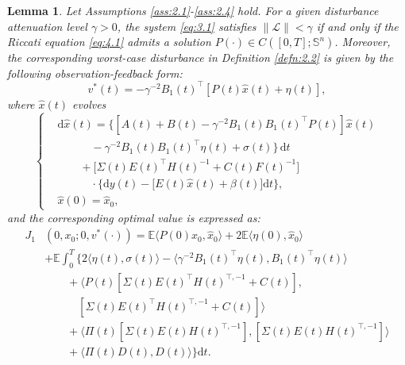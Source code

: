 \documentclass[lettersize,journal]{IEEEtran}
\theoremstyle{plain}
\newtheorem{lem}[thm]{Lemma}
\theoremstyle{definition}
\begin{document}
\begin{lem}\label{lem:4.3}
	Let Assumptions \ref{ass:2.1}-\ref{ass:2.4} hold. For a given disturbance attenuation level $\gamma > 0$, the system \eqref{eq:3.1} satisfies $\|\mathcal{L}\| < \gamma$ if and only if the Riccati equation \eqref{eq:4.1} admits a solution $P(\cdot) \in C([0,T];\mathbb{S}^n)$. Moreover, the corresponding worst-case disturbance in Definition \ref{defn:2.2} is given by the following observation-feedback form:
	\begin{equation}\label{eq:4.5}
		v^*(t) = -\gamma^{-2}B_1(t)^{\top}[P(t)\widehat{x}(t) + \eta(t)],
	\end{equation}
	where $\widehat{x}(t)$ evolves
	\begin{equation*}
		\left\{
		\begin{aligned}
			&\mathrm{d}\widehat{x}(t) = \Big\{[A(t) + B(t) - \gamma^{-2}B_1(t)B_1(t)^{\top}P(t)]\widehat{x}(t) \\
			&\qquad \quad- \gamma^{-2}B_1(t)B_1(t)^{\top}\eta(t) + \sigma(t)\Big\}\,\mathrm{d}t \\
			&\qquad + \Big[\Sigma(t)E(t)^{\top}H(t)^{-1} + C(t)F(t)^{-1}\Big] \\
			&\qquad \quad\cdot \Big\{\mathrm{d}y(t) - \Big[E(t)\widehat{x}(t) + \beta(t)\Big]\mathrm{d}t\Big\},\\
			&\widehat{x}(0) = \widehat{x}_0,
		\end{aligned}
		\right.
	\end{equation*}
	and the corresponding optimal value is expressed as:
	\begin{equation}\label{eq:4.6}
		\begin{aligned}
			J_1&(0,x_0;0,v^*(\cdot)) = \mathbb{E} \langle P(0)\widehat{x}_0,\widehat{x}_0 \rangle + 2\mathbb{E}\langle \eta(0),\widehat{x}_0 \rangle\\
			&+ \mathbb{E}\int_0^T \Big\{ 2\langle \eta(t),\sigma(t) \rangle - \langle \gamma^{-2} B_1(t)^\top \eta(t),B_1(t)^\top \eta(t) \rangle\\
			&\qquad + \langle P(t)[\Sigma(t) E(t)^\top H(t)^{\top,-1} + C(t)],\\
			&\qquad \quad [\Sigma(t)E(t)^\top H(t)^{\top,-1} + C(t)] \rangle\\
			&\qquad +\langle\Pi(t)[\Sigma(t)E(t)H(t)^{\top,-1}],[\Sigma(t)E(t)H(t)^{\top,-1}]\rangle \\
			&\qquad + \langle\Pi(t)D(t),D(t)\rangle \Big\} \mathrm{d}t.
		\end{aligned}
	\end{equation}
\end{lem}
\end{document}
